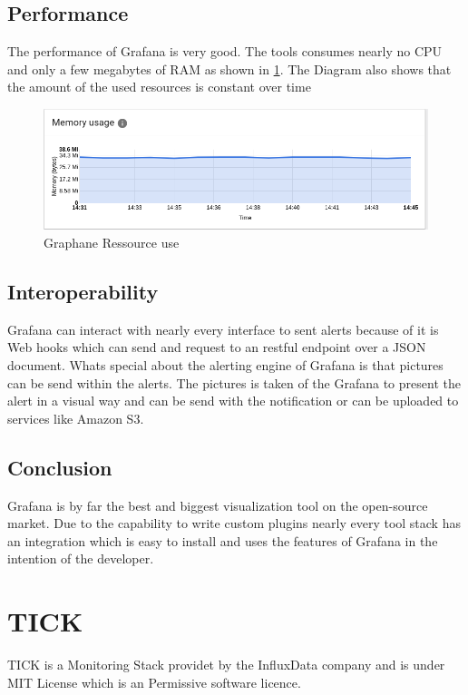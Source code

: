 \subsection{Performance}
The performance of Grafana is very good. The tools consumes nearly no CPU and only a few megabytes of RAM as shown in \cref{fig:Grafan_RAM}. The Diagram also shows that the amount of the used resources is constant over time
\begin{figure}
\centering
\includegraphics[width=\textwidth]{Bilder/Performance/Grafan_RAM}
\caption{Graphane Ressource use}
\label{fig:Grafan_RAM}
\end{figure}
\subsection{Interoperability}
Grafana can interact with nearly every interface to sent alerts because of it is Web hooks which can send and request to an restful endpoint over a JSON document. Whats special about the alerting engine of Grafana is that pictures can be send within the alerts. The pictures is taken of the Grafana to present the alert in a visual way and can be send with the notification or can be uploaded to services like Amazon S3.

\subsection{Conclusion}
Grafana is by far the best and biggest visualization tool on the open-source market. Due to the capability to write custom plugins nearly every tool stack has an integration which is easy to install and uses the features of Grafana in the intention of the developer.

\section{TICK}
\label{tick}
TICK is a Monitoring Stack providet by the InfluxData company and is under MIT License which is an Permissive software licence.
